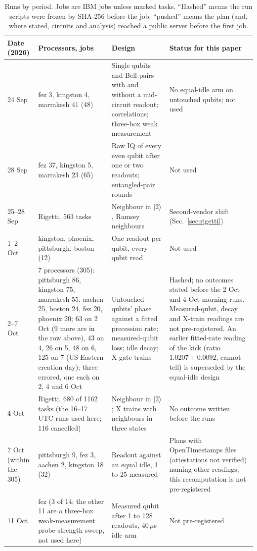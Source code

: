 \documentclass[reprint,amsmath,amssymb,aps,superscriptaddress,nofootinbib]{revtex4-2}
\newcommand{\us}{\,$\mu$s}
\begin{document}
\begin{table}[!tp]
\caption{Runs by period. Jobs are IBM jobs unless marked tasks. ``Hashed'' means the run scripts were frozen by SHA-256 before the job; ``pushed'' means the plan (and, where stated, circuits and analysis) reached a public server before the first job.}
\label{tab:runs}
\footnotesize
\begin{tabular}{p{2.3cm}p{3.6cm}p{6.3cm}p{4.9cm}}
\hline\hline
Date (2026) & Processors, jobs & Design & Status for this paper \\
\hline
24 Sep & fez 3, kingston 4, marrakesh 41 (48) & Single qubits and Bell pairs with and without a mid-circuit readout; correlations; three-box weak measurement & No equal-idle arm on untouched qubits; not used \\
28 Sep & fez 37, kingston 5, marrakesh 23 (65) & Raw IQ of every even qubit after one or two readouts; entangled-pair rounds & Not used \\
25--28 Sep & Rigetti, 563 tasks & Neighbour in $|2\rangle$, Ramsey neighbours & Second-vendor shift (Sec.~\ref{sec:rigetti}) \\
1--2 Oct & kingston, phoenix, pittsburgh, boston (12) & One readout per qubit, every qubit read & Not used \\
2--7 Oct & 7 processors (305): pittsburgh 86, kingston 75, marrakesh 55, aachen 25, boston 24, fez 20, phoenix 20; 63 on 2 Oct (9 more are in the row above), 43 on 4, 26 on 5, 48 on 6, 125 on 7 (US Eastern creation day); three errored, one each on 2, 4 and 6 Oct & Untouched qubits' phase against a fitted precession rate; measured-qubit loss; idle decay; X-gate trains & Hashed; no outcomes stated before the 2 Oct and 4 Oct morning runs. Measured-qubit, decay and X-train readings are not pre-registered. An earlier fitted-rate reading of the kick (ratio $1.0207\pm0.0092$, cannot tell) is superseded by the equal-idle design \\
4 Oct & Rigetti, 680 of 1162 tasks (the 16--17 UTC runs used here; 116 cancelled) & Neighbour in $|2\rangle$; X trains with neighbours in three states & No outcome written before the runs \\
7 Oct (within the 305) & pittsburgh 9, fez 3, aachen 2, kingston 18 (32) & Readout against an equal idle, 1 to 25 measured & Plans with OpenTimestamps files (attestations not verified) naming other readings; this recomputation is not pre-registered \\
11 Oct & fez (3 of 14; the other 11 are a three-box weak-measurement probe-strength sweep, not used here) & Measured qubit after 1 to 128 readouts, 40\us{} idle arm & Not pre-registered \\

\end{tabular}
\end{table}
\end{document}
